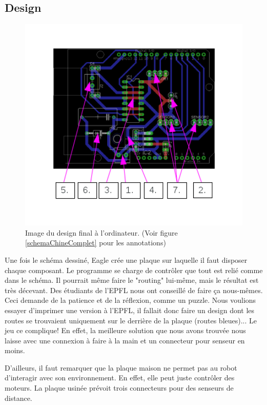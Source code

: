 \documentclass[a4paper,11pt]{report}
\begin{document}
{\begin{enumerate}
\begin{enumerate}
\subsection{Design}
\begin{figure}[h]
\centering
\includegraphics[width=1\textwidth]{board_CHI_annotated.png}
\caption[Design final du PCB]{\label{BoardChine}Image du design final à
  l'ordinateur. (Voir figure \ref{schemaChineComplet} pour les annotations)
}
\end{figure}

Une fois le schéma dessiné, Eagle crée une plaque sur laquelle il faut disposer chaque composant. Le programme se charge de contrôler que tout est relié comme dans le schéma. Il pourrait même faire le "routing" lui-même, mais le résultat est très décevant. Des étudiants de l'EPFL nous ont conseillé de faire ça nous-mêmes. Ceci demande de la patience et de la réflexion, comme un puzzle. Nous voulions essayer d'imprimer une version à l'EPFL, il fallait donc faire un design dont les routes se trouvaient uniquement sur le derrière de la plaque (routes bleues)... Le jeu ce complique! En effet, la meilleure solution que nous avons trouvée nous laisse avec une connexion à faire à la main et un connecteur pour senseur en moins.

D'ailleurs, il faut remarquer que la plaque maison ne permet pas au robot d'interagir avec son environnement. En effet, elle peut juste contrôler des moteurs. La plaque usinée prévoit trois connecteurs pour des senseurs de distance.



\end{enumerate}
\end{enumerate}}
\end{document}
